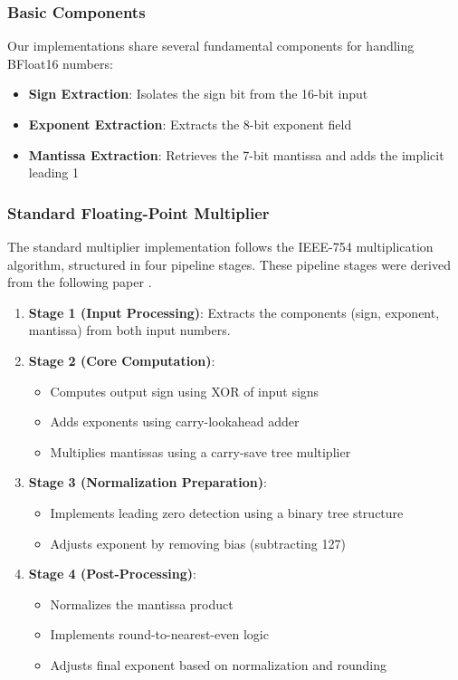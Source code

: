 \documentclass[12pt,letterpaper]{article}
\begin{document}
\subsubsection{Basic Components}

Our implementations share several fundamental components for handling BFloat16 numbers:

\begin{itemize}
    \item \textbf{Sign Extraction}: Isolates the sign bit from the 16-bit input
    \item \textbf{Exponent Extraction}: Extracts the 8-bit exponent field
    \item \textbf{Mantissa Extraction}: Retrieves the 7-bit mantissa and adds the implicit leading 1
\end{itemize}

\subsubsection{Standard Floating-Point Multiplier}

The standard multiplier implementation follows the IEEE-754 multiplication algorithm, structured in four pipeline stages. These pipeline stages were derived from the following paper \citep{niknia2024asic}.

\begin{enumerate}
    \item \textbf{Stage 1 (Input Processing)}: Extracts the components (sign, exponent, mantissa) from both input numbers.
    
    \item \textbf{Stage 2 (Core Computation)}:
    \begin{itemize}
        \item Computes output sign using XOR of input signs
        \item Adds exponents using carry-lookahead adder
        \item Multiplies mantissas using a carry-save tree multiplier
    \end{itemize}
    
    \item \textbf{Stage 3 (Normalization Preparation)}:
    \begin{itemize}
        \item Implements leading zero detection using a binary tree structure
        \item Adjusts exponent by removing bias (subtracting 127)
    \end{itemize}
    
    \item \textbf{Stage 4 (Post-Processing)}:
    \begin{itemize}
        \item Normalizes the mantissa product
        \item Implements round-to-nearest-even logic
        \item Adjusts final exponent based on normalization and rounding
    \end{itemize}
\end{enumerate}
\end{document}
